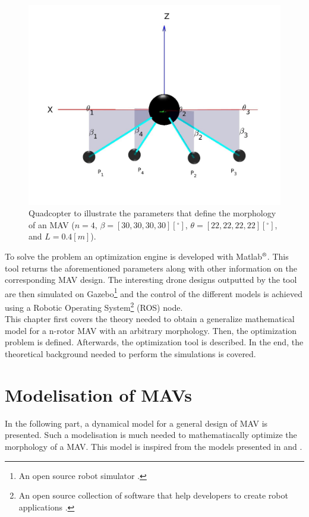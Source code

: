 \begin{figure}[h]
\begin{minipage}[t]{0.3\textwidth}
  \centering
  \includegraphics[width=\textwidth]{images/drone_design2.jpg}
\end{minipage}
\caption{Quadcopter to illustrate the parameters that define the morphology of an
MAV ($n = 4$, $\beta = [30, 30, 30, 30] [^{\circ}]$, $\theta = [22, 22, 22, 22]
[^{\circ}]$, and $L = 0.4 [m]$).}
\label{fig:drone_design}
\end{figure}

To solve the problem an optimization engine is developed with
Matlab$^\textrm{\textregistered}$. This tool returns the aforementioned
parameters along with other information on the corresponding MAV design.
The interesting drone designs outputted by the tool are then simulated on
Gazebo\footnote{An open source robot simulator \citep{noauthor_gazebo_nodate}.}
and the control of the different models is achieved using a Robotic Operating
System\footnote{An open source collection of software that help developers to
create robot applications \citep{rostutorials}.} (ROS) node.\\
This chapter first covers the theory needed to obtain a generalize mathematical
model for a n-rotor MAV with an arbitrary morphology. Then, the optimization
problem is defined. Afterwards, the optimization tool is described. In the end,
the theoretical background needed to perform the simulations is covered.

\section{Modelisation of MAVs}
\label{sec:modeling_mav}
In the following part, a dynamical model for a general design of MAV is presented.
Such a modelisation is much needed to mathematiacally optimize the morphology of
a MAV. This model is inspired from the models presented in
\citep{kamel_voliro:_2018} and \citep{ryll_modeling_2012}.

